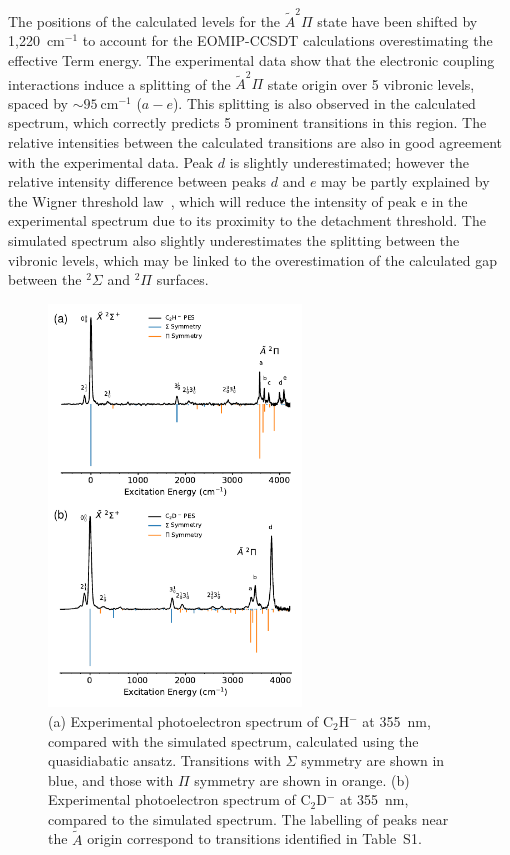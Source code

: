 \documentclass[journal=jpcafh,manuscript=article,layout=onecolumn, 12pt]{achemso}
\begin{document}
The positions of the calculated levels for the $\tilde{A}^2\Pi$ state have been shifted by 1,220~cm$^{-1}$ to account for the EOMIP-CCSDT calculations overestimating the effective Term energy. The experimental data show that the electronic coupling interactions induce a splitting of the $\tilde{A} ^2\Pi$ state origin over 5 vibronic levels, spaced by $\sim 95~$cm$^{-1}$ ($a-e$). This splitting is also observed in the calculated spectrum, which correctly predicts 5 prominent transitions in this region. The relative intensities between the calculated transitions are also in good agreement with the experimental data. Peak $d$ is slightly underestimated; however the relative intensity difference between peaks $d$ and $e$ may be partly explained by the Wigner threshold law~\cite{wig48}, which will reduce the intensity of peak e in the experimental spectrum due to its proximity to the detachment threshold. The simulated spectrum also slightly underestimates the splitting between the vibronic levels, which may be linked to the overestimation of the calculated gap between the $^2\Sigma$ and $^2\Pi$ surfaces.

\begin{figure}[th!]
	\includegraphics[width=0.6\textwidth]{figures/Fig5.pdf}
	\caption{(a) Experimental photoelectron spectrum of C$_2$H$^-$ at 355~nm, compared with the simulated spectrum, calculated using the quasidiabatic ansatz. Transitions with $\Sigma$ symmetry are shown in blue, and those with $\Pi$ symmetry are shown in orange. (b) Experimental photoelectron spectrum of C$_2$D$^-$ at 355~nm, compared to the simulated spectrum. The labelling of peaks near the $\tilde{A}$ origin correspond to transitions identified in Table~S1.}
	\label{fig:3}
\end{figure}
\end{document}
